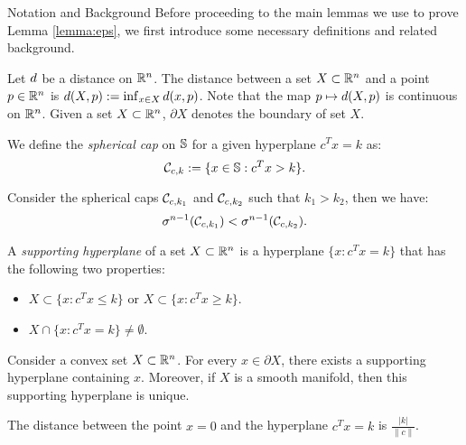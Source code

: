 \begin{subsection}{Notation and Background}
Before proceeding to the main lemmas we use to prove Lemma \ref{lemma:eps}, we first introduce some necessary definitions and related background.

Let $d$ be a distance on $\mathbb{R}^n$. The distance between a set $X \subset \mathbb{R}^n$ and a point $p \in \mathbb{R}^n$ is $d(X, p):=\inf_{x \in X}d(x,p)$. Note that the map $p \mapsto d(X,p)$ is continuous on $\mathbb{R}^n$. Given a set $X \subset \mathbb{R}^n$, $\partial X$ denotes the boundary of set $X$.

\begin{definition}%
We define the \emph{spherical cap} on $\mathbb{S}$ for a given hyperplane $c^Tx = k$ as:
\begin{equation*}\mathcal{C}_{c,k} := \{x \in \mathbb{S} : c^Tx >k\}.\end{equation*}
\end{definition}

\begin{remark}\label{lemma:muMonotone}Consider the spherical caps $\mathcal{C}_{c, k_1}$ and $\mathcal{C}_{c, k_2}$ such that $k_1 > k_2$, then we have:
$$\sigma^{n-1}(\mathcal{C}_{c,k_1}) < \sigma^{n-1}(\mathcal{C}_{c,k_2}).$$
\end{remark}


\begin{definition}A \emph{supporting hyperplane} of a set $X \subset \mathbb{R}^n$ is a hyperplane $\{x:c^Tx = k\}$ that has the following two properties:
\begin{itemize}
\item $X \subset \{x: c^Tx \leq k\}$ or $X \subset \{x: c^Tx \geq k\}$.
\item $X \cap \{x: c^Tx = k\} \not= \emptyset$.
\end{itemize}
\end{definition}

\begin{remark}\label{suppHyperplaneRemark}\cite{boyd} Consider a convex set $X \subset \mathbb{R}^n$. For every $x \in \partial X$, there exists a supporting hyperplane containing $x$. Moreover, if $X$ is a smooth manifold, then this supporting hyperplane is unique.
\end{remark}

\begin{remark}\label{prop:distance}The distance between the point $x=0$ and the hyperplane $c^Tx = k$ is $\frac{|k|}{\|c\|}$.
\end{remark}


\end{subsection}
